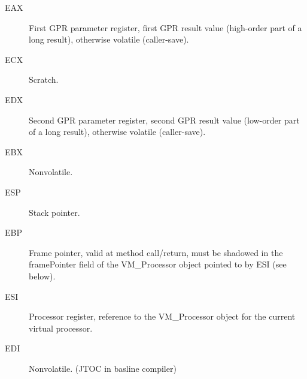 \begin{description}
\item [EAX]
    First GPR parameter register, first GPR result value (high-order part
    of a long result), otherwise volatile (caller-save).

\item[ECX]
    Scratch.

\item[EDX]
    Second GPR parameter register, second GPR result value (low-order part
    of a long result), otherwise volatile (caller-save).

\item[EBX]
    Nonvolatile.

\item[ESP]
    Stack pointer.

\item[EBP]
    Frame pointer, valid at method call/return, must be shadowed in the
    framePointer field of the VM\_Processor object pointed to by ESI (see
    below).

\item[ESI]
    Processor register, reference to the VM\_Processor object for the current
    virtual processor.

\item[EDI]
    Nonvolatile.  (JTOC in basline compiler)

\end{description}


